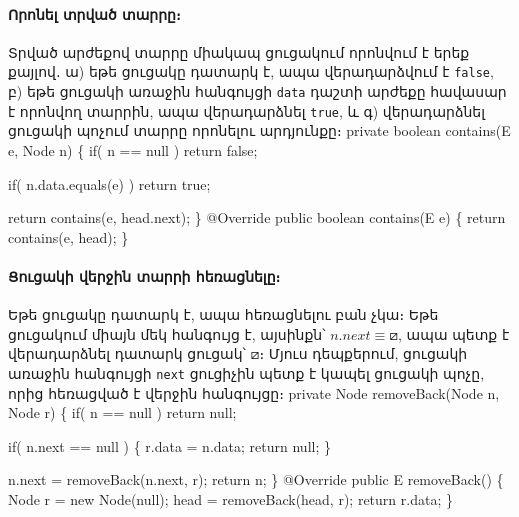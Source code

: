 %
%
\paragraph{Որոնել տրված տարրը։}
Տրված արժեքով տարրը միակապ ցուցակում որոնվում է երեք քայլով․ 
ա) եթե ցուցակը դատարկ է, ապա վերադարձվում է \texttt{false},
բ) եթե ցուցակի առաջին հանգույցի \texttt{data} դաշտի արժեքը 
հավասար է որոնվող տարրին, ապա վերադարձնել \texttt{true}, և
գ) վերադարձնել ցուցակի պոչում տարրը որոնելու արդյունքը։
\nwenddocs{}\endmoddef{}
private boolean contains(E e, Node n)
\{
  if( n == null )
    return false;

  if( n.data.equals(e) )
    return true;

  return contains(e, head.next);
\}
@Override
public boolean contains(E e)
\{
    return contains(e, head);
\}
\nwendcode{}\nwdocspar


%
%
\paragraph{Ցուցակի վերջին տարրի հեռացնելը։}
Եթե ցուցակը դատարկ է, ապա հեռացնելու բան չկա։ Եթե ցուցակում 
միայն մեկ հանգույց է, այսինքն՝ \(n.next\equiv\boxslash\), ապա 
պետք է վերադարձնել դատարկ ցուցակ՝ \(\boxslash\)։ Մյուս դեպքերում, 
ցուցակի առաջին հանգույցի \texttt{next} ցուցիչին պետք է կապել 
ցուցակի պոչը, որից հեռացված է վերջին հանգույցը։
\nwenddocs{}\endmoddef{}
private Node removeBack(Node n, Node r)
\{
  if( n == null )
    return null;

  if( n.next == null ) \{
    r.data = n.data;
    return null;
  \}

  n.next = removeBack(n.next, r);
  return n;
\}
@Override
public E removeBack()
\{
  Node r = new Node(null);
  head = removeBack(head, r);
  return r.data;
\}
\nwendcode{}\nwdocspar


%
%
